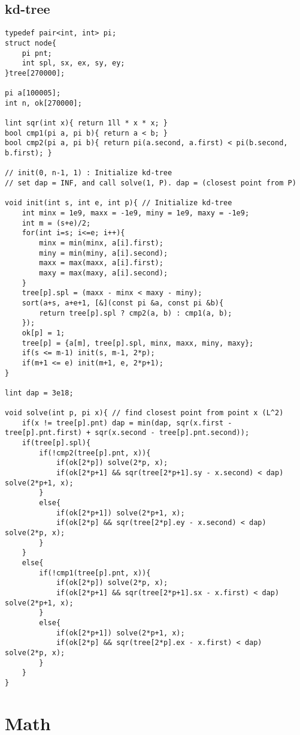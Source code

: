 \documentclass[landscape, 8pt, a4paper, oneside,  twocolumn]{extarticle}
\begin{document}
\subsection{kd-tree}
\begin{verbatim}
typedef pair<int, int> pi;
struct node{
	pi pnt;
	int spl, sx, ex, sy, ey;
}tree[270000];

pi a[100005];
int n, ok[270000];

lint sqr(int x){ return 1ll * x * x; }
bool cmp1(pi a, pi b){ return a < b; }
bool cmp2(pi a, pi b){ return pi(a.second, a.first) < pi(b.second, b.first); }

// init(0, n-1, 1) : Initialize kd-tree
// set dap = INF, and call solve(1, P). dap = (closest point from P)

void init(int s, int e, int p){ // Initialize kd-tree
	int minx = 1e9, maxx = -1e9, miny = 1e9, maxy = -1e9;
	int m = (s+e)/2;
	for(int i=s; i<=e; i++){
		minx = min(minx, a[i].first);
		miny = min(miny, a[i].second);
		maxx = max(maxx, a[i].first);
		maxy = max(maxy, a[i].second);
	}
	tree[p].spl = (maxx - minx < maxy - miny);
	sort(a+s, a+e+1, [&](const pi &a, const pi &b){
		return tree[p].spl ? cmp2(a, b) : cmp1(a, b);
	});
	ok[p] = 1;
	tree[p] = {a[m], tree[p].spl, minx, maxx, miny, maxy};
	if(s <= m-1) init(s, m-1, 2*p);
	if(m+1 <= e) init(m+1, e, 2*p+1);
}

lint dap = 3e18;

void solve(int p, pi x){ // find closest point from point x (L^2) 
	if(x != tree[p].pnt) dap = min(dap, sqr(x.first - tree[p].pnt.first) + sqr(x.second - tree[p].pnt.second));
	if(tree[p].spl){
		if(!cmp2(tree[p].pnt, x)){
			if(ok[2*p]) solve(2*p, x);
			if(ok[2*p+1] && sqr(tree[2*p+1].sy - x.second) < dap) solve(2*p+1, x);
		}
		else{
			if(ok[2*p+1]) solve(2*p+1, x);
			if(ok[2*p] && sqr(tree[2*p].ey - x.second) < dap) solve(2*p, x);
		}
	}
	else{
		if(!cmp1(tree[p].pnt, x)){
			if(ok[2*p]) solve(2*p, x);
			if(ok[2*p+1] && sqr(tree[2*p+1].sx - x.first) < dap) solve(2*p+1, x);
		}
		else{
			if(ok[2*p+1]) solve(2*p+1, x);
			if(ok[2*p] && sqr(tree[2*p].ex - x.first) < dap) solve(2*p, x);
		}
	}
}
\end{verbatim}

\section{Math}
\end{document}
